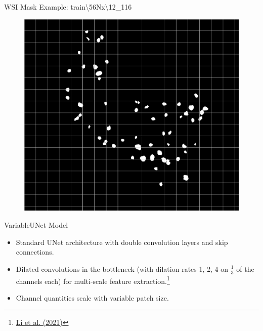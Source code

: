 \documentclass{beamer}
\begin{document}
\begin{frame}{WSI Mask Example: train\textbackslash56Nx\textbackslash12\_116}
    \begin{figure}
        \vspace{-0.14cm}
        \centering
        \includegraphics[height=0.877\textheight]{Images/mask_thumbnail_with_grid.png}
    \end{figure}

\end{frame}

\begin{frame}{VariableUNet Model}
    \begin{itemize}
        \item Standard UNet architecture with double convolution layers and skip connections.
        \item Dilated convolutions in the bottleneck (with dilation rates 1, 2, 4 on $\frac{1}{3}$ of the channels each) for multi-scale feature extraction.\footnote{\href{https://doi.org/10.1117/1.JMI.8.6.067501}{Li et al. (2021)}}
        \item Channel quantities scale with variable patch size.
    \end{itemize}
    
        
\end{frame}
\end{document}
